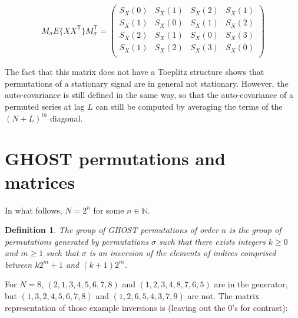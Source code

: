\documentclass[12pt]{article}
\newtheorem{definition}{Definition}
\begin{document}
  \begin{equation*}
    M_\sigma E\{XX^\mathsf{T}\} M_\sigma^\mathsf{T} =
    \left(
    \begin{array}{cccc}
      S_X(0) & S_X(1) & S_X(2) & S_X(1) \\
      S_X(1) & S_X(0) & S_X(1) & S_X(2) \\
      S_X(2) & S_X(1) & S_X(0) & S_X(3) \\
      S_X(1) & S_X(2) & S_X(3) & S_X(0) \\
    \end{array}
    \right)
  \end{equation*}

  The fact that this matrix does not have a Toeplitz structure shows that
  permutations of a stationary signal are in general not stationary.
  However, the auto-covariance is still defined in the same way,
  so that the auto-covariance of a permuted series at lag $L$ can
  still be computed by averaging the terms of the $(N+L)^{th}$
  diagonal.

  \section{GHOST permutations and matrices}

  In what follows, $N = 2^n$ for some $n \in \mathbb{N}$.

  \begin{definition}

    The group of GHOST permutations of order $n$ is the group of
    permutations generated by permutations $\sigma$ such that there
    exists integers $k \geq 0$ and $m \geq 1$ such that $\sigma$ is an
    inversion of the elements of indices comprised between $k2^m + 1$
    and $(k+1)2^m$.
  
  \end{definition}

  For $N = 8$, $(2,1,3,4,5,6,7,8)$ and $(1,2,3,4,8,7,6,5)$ are in the
  generator, but $(1,3,2,4,5,6,7,8)$ and $(1,2,6,5,4,3,7,9)$ are not.
  The matrix representation of those example inversions is (leaving out
  the 0's for contrast):
\end{document}
